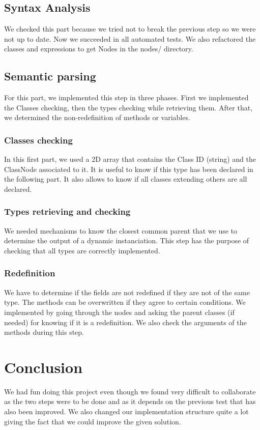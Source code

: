 \documentclass[a4paper,11pt]{article}
\begin{document}
\subsection{Syntax Analysis}
We checked this part because we tried not to break the previous step so we were not up to date. 
Now we succeeded in all automated tests. We also refactored the classes and expressions to get Nodes in the nodes/ directory.

\subsection{Semantic parsing}
For this part, we implemented this step in three phases. First we implemented the Classes checking, 
then the types checking while retrieving them. After that, we determined the non-redefinition of methods or variables.

\subsubsection{Classes checking}
In this first part, we used a 2D array that contains the Class ID (string) and the ClassNode 
associated to it. 
It is useful to know if this type has been declared in the following part. It also allows to 
know if all classes extending others are all declared.
  
\subsubsection{Types retrieving and checking}
We needed mechanisms to know the closest common parent that we use to determine the output 
of a dynamic instanciation. 
This step has the purpose of checking that all types are correctly implemented.

\subsubsection{Redefinition}
We have to determine if the  fields are not redefined if they are not of the same type. 
The methods can be overwritten if they agree to certain conditions. We implemented by going through the nodes
and asking the parent classes (if needed) for knowing if it is a redefinition.
We also check the arguments of the methods during this step.

\section{Conclusion}
We had fun doing this project even though we found very difficult to collaborate as the two steps were
to be done and as it depends on the previous test that has also been improved. We also changed our implementation
structure quite a lot giving the fact that we could improve the given solution.
\end{document}
